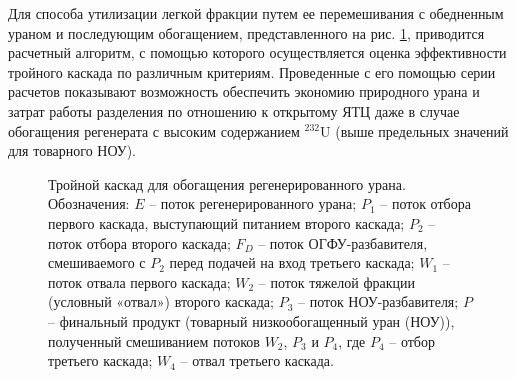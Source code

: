 Для способа утилизации легкой фракции путем ее перемешивания с обедненным ураном и последующим обогащением, представленного на рис. \ref{p2_withDepU}, приводится расчетный алгоритм, с помощью которого осуществляется оценка эффективности тройного каскада по различным критериям. Проведенные с его помощью серии расчетов показывают возможность обеспечить экономию  природного урана и затрат работы разделения по отношению к открытому ЯТЦ даже в случае обогащения регенерата с высоким содержанием $^{232}$U (выше предельных значений для товарного НОУ).

\begin{figure}[ht]
  \caption{Тройной каскад для обогащения регенерированного урана. Обозначения: $E$ -- поток регенерированного урана; $P_1$ -- поток отбора первого каскада, выступающий питанием второго каскада; $P_2$ -- поток отбора второго каскада; $F_{D}$ -- поток ОГФУ-разбавителя, смешиваемого с $P_2$ перед подачей на вход третьего каскада; $W_1$ -- поток отвала первого каскада; $W_2$ -- поток тяжелой фракции (условный «отвал») второго каскада; $P_3$ -- поток НОУ-разбавителя; $P$ -- финальный продукт (товарный низкообогащенный уран (НОУ)), полученный смешиванием потоков $W_2$, $P_3$ и $P_4$, где $P_4$ -- отбор третьего каскада; $W_4$ -- отвал третьего каскада.}\label{p2_withDepU}
\end{figure}

